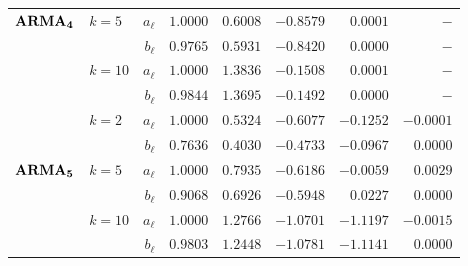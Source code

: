\documentclass[a4paper, 12pt]{article}
\begin{document}
\begin{table}[ht]
\begin{tabular}{clrrrrrr}
		\multirow{2}{*}{\(\boldsymbol{\text{\textbf{ARMA}}_4}\)} & \multirow{2}{*}{\(k = 5\)}  & \(a_\ell\) & \(1.0000\)              & \(0.6008\)              & \(-0.8579\)             & \(0.0001\)              & \( - \)                 \\
		                                                         &                             & \(b_\ell\) & \(0.9765\)              & \(0.5931\)              & \(-0.8420\)             & \(0.0000\)              & \( - \)                 \\ \cmidrule(l){2-8}
		                                                         & \multirow{2}{*}{\(k = 10\)} & \(a_\ell\) & \(1.0000\)              & \(1.3836\)              & \(-0.1508\)             & \(0.0001\)              & \( - \)                 \\
		                                                         &                             & \(b_\ell\) & \(0.9844\)              & \(1.3695\)              & \(-0.1492\)             & \(0.0000\)              & \( - \)                 \\ \midrule
		                                                         & \multirow{2}{*}{\(k = 2\)}  & \(a_\ell\) & \(1.0000\)              & \(0.5324\)              & \(-0.6077\)             & \(-0.1252\)             & \(-0.0001\)             \\
		                                                         &                             & \(b_\ell\) & \(0.7636\)              & \(0.4030\)              & \(-0.4733\)             & \(-0.0967\)             & \(0.0000\)              \\   \cmidrule(l){2-8}
		\multirow{2}{*}{\(\boldsymbol{\text{\textbf{ARMA}}_5}\)} & \multirow{2}{*}{\(k = 5\)}  & \(a_\ell\) & \(1.0000\)              & \(0.7935\)              & \(-0.6186\)             & \(-0.0059\)             & \(0.0029\)              \\
		                                                         &                             & \(b_\ell\) & \(0.9068\)              & \(0.6926\)              & \(-0.5948\)             & \(0.0227\)              & \(0.0000\)              \\   \cmidrule(l){2-8}
		                                                         & \multirow{2}{*}{\(k = 10\)} & \(a_\ell\) & \(1.0000\)              & \(1.2766\)              & \(-1.0701\)             & \(-1.1197\)             & \(-0.0015\)             \\
		                                                         &                             & \(b_\ell\) & \(0.9803\)              & \(1.2448\)              & \(-1.0781\)             & \(-1.1141\)             & \(0.0000\)              \\
		\bottomrule
	\end{tabular}
\end{table}
\end{document}
